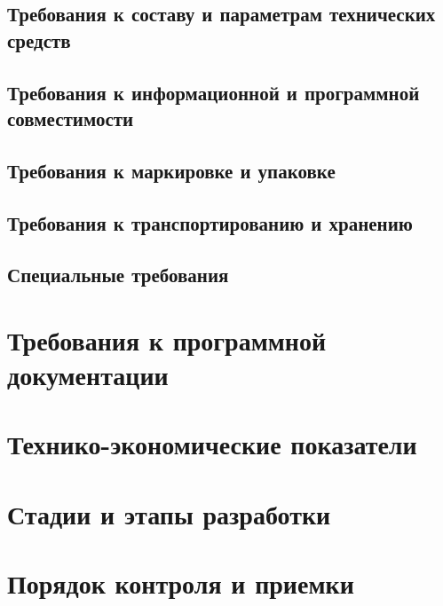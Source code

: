 \documentclass[techtask]{espd}
\begin{document}
\subsection{Требования к составу и параметрам технических средств}
\subsection{Требования к информационной и программной совместимости}
\subsection{Требования к маркировке и упаковке}
\subsection{Требования к транспортированию и хранению}
\subsection{Специальные требования}

\section{Требования к программной документации}
\section{Технико-экономические показатели}
\section{Стадии и этапы разработки}
\section{Порядок контроля и приемки}

%
\end{document}
